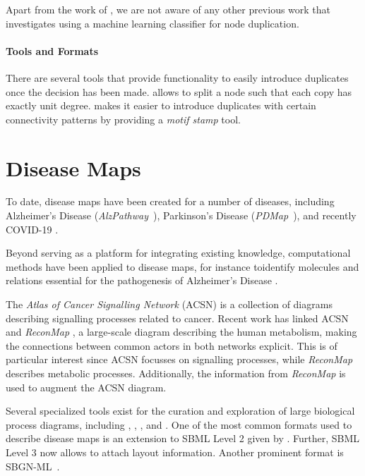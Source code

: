 \documentclass[
	fontsize=10pt, %
	twoside=false, %
	secnumdepth=1, %
  toc=indentunnumbered %
]{kaobook}
\begin{document}
Apart from the work of \citeauthor{nielsen_MachineLearningSupport_2019}, we are
not aware of any other previous work that investigates using a machine learning
classifier for node duplication.


\paragraph{Tools and Formats}
There are several tools that provide functionality to easily introduce
duplicates once the decision has been made. 
\cite{villeger_ArcadiaVisualizationTool_2010} allows to split a node such that
each copy has exactly unit degree. 
\cite{droste_OmixVisualizationTool_2013} makes it easier to introduce duplicates
with certain connectivity patterns by providing a \textit{motif stamp} tool.
%


\section{Disease Maps}
To date, disease maps have been created for a number of diseases, including
Alzheimer's Disease (\textit{AlzPathway}~\cite{ogishima_AlzPathwayUpdatedMap_2016}),
Parkinson's Disease (\textit{PDMap}~\cite{fujita_IntegratingPathwaysParkinson_2014}),
and recently \textsc{COVID-19}
\cite{ostaszewski_COVID19DiseaseMap_2020}.

Beyond serving as a platform for integrating existing knowledge, computational
methods have been applied to disease maps, for instance toidentify molecules and
relations essential for the pathogenesis of Alzheimer's Disease
\cite{mizuno_NetworkAnalysisComprehensive_2016}.

The \textit{Atlas of Cancer Signalling Network} (ACSN)
\cite{kuperstein_AtlasCancerSignalling_2015} is a collection of diagrams
describing signalling processes related to cancer. Recent work
\cite{sompairac_metabolic_2019} has linked ACSN and \textit{ReconMap}
\cite{noronha_ReconMapInteractiveVisualization_2017}, a
large-scale diagram describing the human metabolism, making
the connections between common actors in both networks explicit. This is of
particular interest since ACSN focusses on signalling processes, while
\textit{ReconMap} describes metabolic processes.
Additionally, the information from \textit{ReconMap} is used to augment the ACSN diagram.


Several specialized tools exist for the curation and exploration of large
biological process diagrams, including 
\cite{funahashi_CellDesignerVersatileModeling_2008}, 
\cite{gawron_MINERVAPlatformVisualization_2016}, 
\cite{kuperstein_NaviCellWebbasedEnvironment_2013}, 
\cite{shannon_cytoscape_2003} and 
\cite{rohn_VANTEDV2Framework_2012}.
%
One of the most common formats used to describe disease maps is an extension to SBML
Level 2 given by . Further, SBML Level 3 now allows to attach
layout information. Another prominent format is SBGN-ML~\cite{bergmann_SystemsBiologyGraphical_2020}.
\end{document}
